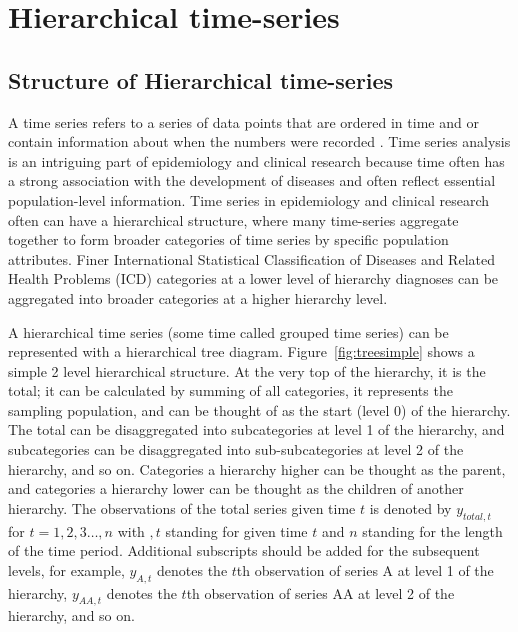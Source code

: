 \section{Hierarchical time-series}

\subsection{ Structure of Hierarchical time-series}

A time series refers to a series of data points that are ordered in time and or contain information about when the numbers were recorded \citep{das1994time,hyndman2018forecasting}. Time series analysis is an intriguing part of epidemiology and clinical research because time often has a strong association with the development of diseases and often reflect essential population-level information. Time series in epidemiology and clinical research often can have a hierarchical structure, where many time-series aggregate together to form broader categories of time series by specific population attributes.  Finer International Statistical Classification of Diseases and Related Health Problems (ICD)\citep{WHO2019} categories at a lower level of hierarchy diagnoses can be aggregated into broader categories at a higher hierarchy level. 

\newpara

A hierarchical time series (some time called grouped time series) can be represented with a hierarchical tree diagram. Figure~\ref{fig:treesimple} shows a simple 2 level hierarchical structure. At the very top of the hierarchy, it is the total; it can be calculated by summing of all categories, it represents the sampling population, and can be thought of as the start (level 0) of the hierarchy. The total can be disaggregated into subcategories at level 1 of the hierarchy, and subcategories can be disaggregated into sub-subcategories at level 2 of the hierarchy, and so on. Categories a hierarchy higher can be thought as the parent, and categories a hierarchy lower can be thought as the children of another hierarchy. The observations of the total series given time $t$ is denoted by $y_{total,t}$ for $t=1,2,3…,n$ with $,t$ standing for given time $t$ and $n$ standing for the length of the time period. Additional subscripts should be added for the subsequent levels, for example, $y_{A,t}$ denotes the $t$th observation of series A at level 1 of the hierarchy, $y_{AA,t}$ denotes the $t$th observation of series AA at level 2 of the hierarchy, and so on.

